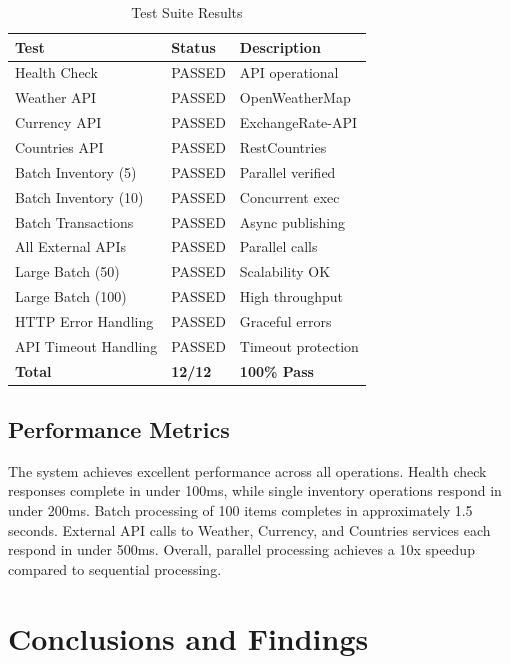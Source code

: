 \documentclass[conference]{IEEEtran}
\begin{document}
\begin{table}[!t]
\caption{Test Suite Results}
\centering
\small
\begin{tabular}{p{3.5cm}p{1.2cm}p{2.2cm}}
\toprule
\textbf{Test} & \textbf{Status} & \textbf{Description} \\
\midrule
Health Check & PASSED & API operational \\
Weather API & PASSED & OpenWeatherMap \\
Currency API & PASSED & ExchangeRate-API \\
Countries API & PASSED & RestCountries \\
Batch Inventory (5) & PASSED & Parallel verified \\
Batch Inventory (10) & PASSED & Concurrent exec \\
Batch Transactions & PASSED & Async publishing \\
All External APIs & PASSED & Parallel calls \\
Large Batch (50) & PASSED & Scalability OK \\
Large Batch (100) & PASSED & High throughput \\
HTTP Error Handling & PASSED & Graceful errors \\
API Timeout Handling & PASSED & Timeout protection \\
\midrule
\textbf{Total} & \textbf{12/12} & \textbf{100\% Pass} \\
\bottomrule
\end{tabular}
\end{table}

\subsection{Performance Metrics}

The system achieves excellent performance across all operations. Health check responses complete in under 100ms, while single inventory operations respond in under 200ms. Batch processing of 100 items completes in approximately 1.5 seconds. External API calls to Weather, Currency, and Countries services each respond in under 500ms. Overall, parallel processing achieves a 10x speedup compared to sequential processing.

\section{Conclusions and Findings}
\label{sec:conclusions}
\end{document}
